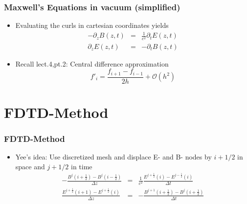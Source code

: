 \documentclass[ignorenonframetext]{beamer}
\begin{document}
\begin{frame}
\frametitle{Maxwell's Equations in vacuum (simplified)}
\begin{itemize}
\item Evaluating the curls in cartesian coordinates yields
\begin{eqnarray}
-\partial_z B(z, t) &=& \frac{1}{c^2} \partial_t E(z, t)\nonumber\\
\partial_z E(z, t)  &=& -\partial_t B(z, t)
\end{eqnarray}
\item Recall lect.4,pt.2: Central difference approximation
\begin{equation}
f'_i = \frac{f_{i+1} - f_{i-1}}{2h} + \mathcal{O}(h^2) 
\end{equation}
\end{itemize}
\end{frame}

\section{FDTD-Method}
\begin{frame}
\frametitle{FDTD-Method}
\begin{itemize}
\item Yee's idea: Use discretized mesh and displace E- and B- nodes by $i + 1/2$ in space and $j + 1/2$ in time 
\begin{eqnarray}
- \frac{B^{j}(i+\frac{1}{2}) - B^{j}(i-\frac{1}{2})}{\Delta z} &=& \frac{1}{c^2} \frac{E^{j+\frac{1}{2}}(i) - E^{j-\frac{1}{2}}(i)}{\Delta t}\nonumber\\
\frac{E^{j+\frac{1}{2}}(i + 1) - E^{j+\frac{1}{2}}(i)}{\Delta z} &=& -\frac{B^{j+1}(i+\frac{1}{2}) - B^{j}(i+\frac{1}{2})}{\Delta t} 
\end{eqnarray}
\begin{figure}
\centering
\end{figure}

\end{itemize}
\end{frame}
\end{document}
